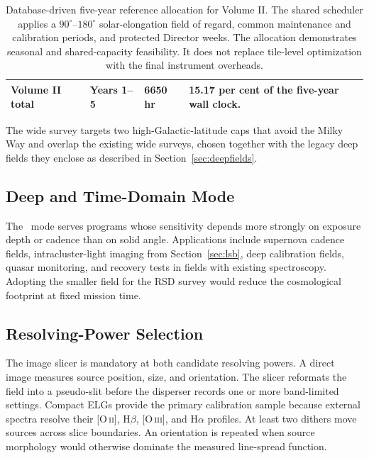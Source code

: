\begin{table}[htbp]
\begin{tabularx}{\textwidth}{@{}
  >{\raggedright\arraybackslash}p{3.7cm}
  >{\raggedright\arraybackslash}p{2.25cm}
  >{\raggedright\arraybackslash}p{2.2cm}
  >{\raggedright\arraybackslash}X@{}}
\midrule
\textbf{Volume II total} & \textbf{Years 1--5} & \textbf{6650 hr} & \textbf{15.17 per cent of the five-year wall clock.}\\
\bottomrule
\end{tabularx}
\caption{Database-driven five-year reference allocation for Volume II. The shared scheduler applies a $90^\circ$--$180^\circ$ solar-elongation field of regard, common maintenance and calibration periods, and protected Director weeks. The allocation demonstrates seasonal and shared-capacity feasibility. It does not replace tile-level optimization with the final instrument overheads.}
\label{tab:timeline}
\end{table}



The wide survey targets two high-Galactic-latitude caps that avoid the Milky Way and overlap the existing wide surveys, chosen together with the legacy deep fields they enclose as described in Section~\ref{sec:deepfields}.

\subsection{Deep and Time-Domain Mode}

The \fovsmall\ mode serves programs whose sensitivity depends more strongly on exposure depth or cadence than on solid angle. Applications include supernova cadence fields, intracluster-light imaging from Section~\ref{sec:lsb}, deep calibration fields, quasar monitoring, and recovery tests in fields with existing spectroscopy. Adopting the smaller field for the RSD survey would reduce the cosmological footprint at fixed mission time.

\subsection{Resolving-Power Selection}

The image slicer is mandatory at both candidate resolving powers. A direct image measures source position, size, and orientation. The slicer reformats the field into a pseudo-slit before the disperser records one or more band-limited settings. Compact ELGs provide the primary calibration sample because external spectra resolve their [O\,\textsc{ii}], H$\beta$, [O\,\textsc{iii}], and H$\alpha$ profiles. At least two dithers move sources across slice boundaries. An orientation is repeated when source morphology would otherwise dominate the measured line-spread function.


